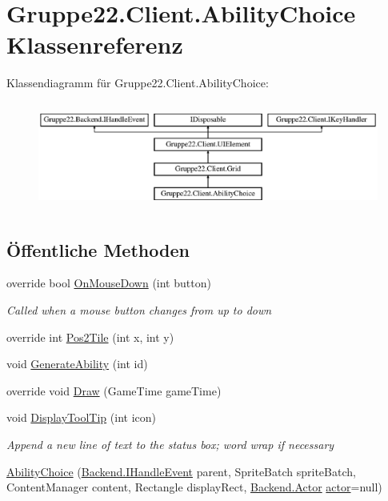 \hypertarget{class_gruppe22_1_1_client_1_1_ability_choice}{\section{Gruppe22.\-Client.\-Ability\-Choice Klassenreferenz}
\label{class_gruppe22_1_1_client_1_1_ability_choice}
}
Klassendiagramm für Gruppe22.\-Client.\-Ability\-Choice\-:\begin{figure}[H]
\begin{center}
\leavevmode
\includegraphics[height=3.589744cm]{class_gruppe22_1_1_client_1_1_ability_choice}
\end{center}
\end{figure}
\subsection*{Öffentliche Methoden}
\begin{DoxyCompactItemize}
\item 
override bool \hyperlink{class_gruppe22_1_1_client_1_1_ability_choice_a15b4f981409cdc4b6f8c94a50e0df81f}{On\-Mouse\-Down} (int button)
\begin{DoxyCompactList}\small\item\em Called when a mouse button changes from up to down \end{DoxyCompactList}\item 
override int \hyperlink{class_gruppe22_1_1_client_1_1_ability_choice_a8a27d3ed23f7d873aff9a73e70775c87}{Pos2\-Tile} (int x, int y)
\item 
void \hyperlink{class_gruppe22_1_1_client_1_1_ability_choice_aad5248a5ad8c9e2b6126b12570e48006}{Generate\-Ability} (int id)
\item 
override void \hyperlink{class_gruppe22_1_1_client_1_1_ability_choice_ac4fc4ffdc4771811c6252d1da748127a}{Draw} (Game\-Time game\-Time)
\item 
void \hyperlink{class_gruppe22_1_1_client_1_1_ability_choice_a21bda333dd5c3f3b8b7583b38ba9bd38}{Display\-Tool\-Tip} (int icon)
\begin{DoxyCompactList}\small\item\em Append a new line of text to the status box; word wrap if necessary \end{DoxyCompactList}\item 
\hyperlink{class_gruppe22_1_1_client_1_1_ability_choice_a105763bd56b618db7f05091f013d0890}{Ability\-Choice} (\hyperlink{interface_gruppe22_1_1_backend_1_1_i_handle_event}{Backend.\-I\-Handle\-Event} parent, Sprite\-Batch sprite\-Batch, Content\-Manager content, Rectangle display\-Rect, \hyperlink{class_gruppe22_1_1_backend_1_1_actor}{Backend.\-Actor} \hyperlink{class_gruppe22_1_1_client_1_1_ability_choice_a6ba233119143416fd07771ab05b8b7c9}{actor}=null)
\end{DoxyCompactItemize}
